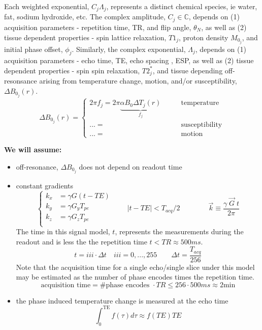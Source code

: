 \documentclass{article}         %
\theoremstyle{definition}
\theoremstyle{remark}
\begin{document}
Each weighted exponential, $C_j \Lambda_j$, represents a distinct chemical species,
ie water, fat, sodium hydroxide, etc. 
The complex amplitude,
$C_j \in \mathbb{C}$, 
depends on (1) acquisition parameters - repetition time, TR,
and flip angle, $\theta_N$, as well as (2) tissue dependent properties -
 spin lattice relaxation,  $T1_j$,
 proton density $M_{0_j}$, and
 initial phase offset, $\phi_j$.
Similarly, the complex exponential, $\Lambda_j$,
depends on (1) acquisition parameters - echo time, TE,
echo spacing , ESP, as well as (2) tissue dependent properties -
 spin spin relaxation,  $T2^*_j$, and tissue depending off-resonsance
arising from temperature change, motion, and/or susceptibility, 
$\Delta B_{0_j}(r)$.
\[
 \Delta B_{0_j}(r) = 
\left\{ 
\begin{split}
                2\pi f_j = 2\pi \underbrace{\alpha B_0 \Delta T_j(r)}_{f_j} & \qquad \text{temperature}   
\\
                ... =      & \qquad \text{susceptibility}   
\\
                ... =      & \qquad \text{motion}   
\end{split}
\right.
\]


\textbf{We will assume:} 
\begin{itemize} 
 \item off-resonance, $\Delta B_{0_j}$ does not depend on readout time
 \item constant gradients 
        \[ \left\{
             \begin{split}
           k_x & = \gamma G (t - TE) \\
           k_y & = \gamma  G_y T_{pe} \\
           k_z & = \gamma  G_z T_{pe} \\
           \end{split}
           \right. \qquad
          |t-TE| < T_{acq}/2
          \qquad \qquad
          \vec{k} \equiv \frac{\gamma \; \vec{G} \; t}{2 \pi}
        \]
The time in this signal model, $t$, represents the measurements during
the readout and is less the the repetition time $t < TR \approx 500ms$.
\[
  t =  iii \cdot \Delta t \quad iii = 0, ..., 255
\qquad 
  \Delta t = \frac{T_{acq}}{256} 
\]
Note that the acquisition time for a single echo/single slice under this model may be
estimated as the number of phase encodes times the repetition time.
\[
   \text{acquisition time} = \# \text{phase encodes } \cdot TR 
                           \leq 256 \cdot 500ms \approx 2 \text{min}
\]

 \item the phase induced temperature change is measured at the echo time
  \[
    \int_0^\text{TE} f(\tau) d\tau \approx f(TE) TE
  \]
\end{itemize} 
\end{document}
